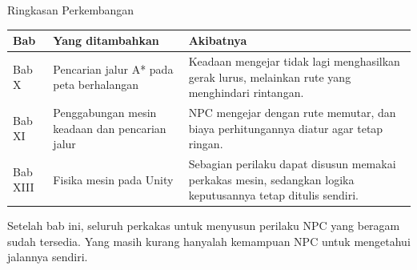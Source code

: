 \documentclass[aspectratio=169,10pt]{beamer}
\begin{document}
\begin{frame}{Ringkasan Perkembangan}
{\scriptsize
\renewcommand{\arraystretch}{1.12}
\begin{tabularx}{\textwidth}{@{}>{\raggedright\arraybackslash}p{1.7cm}
    >{\raggedright\arraybackslash}p{4.9cm}
    >{\raggedright\arraybackslash}X@{}}
\toprule
\textbf{Bab} & \textbf{Yang ditambahkan} & \textbf{Akibatnya} \\
\midrule
Bab X & Pencarian jalur A* pada peta berhalangan &
Keadaan mengejar tidak lagi menghasilkan gerak lurus, melainkan rute yang
menghindari rintangan. \\
\addlinespace
Bab XI & Penggabungan mesin keadaan dan pencarian jalur &
NPC mengejar dengan rute memutar, dan biaya perhitungannya diatur agar tetap
ringan. \\
\addlinespace
Bab XIII & Fisika mesin pada Unity &
Sebagian perilaku dapat disusun memakai perkakas mesin, sedangkan logika
keputusannya tetap ditulis sendiri. \\
\bottomrule
\end{tabularx}}
\vspace{0.10cm}
\begin{kotak}
Setelah bab ini, seluruh perkakas untuk menyusun perilaku NPC yang beragam sudah
tersedia. Yang masih kurang hanyalah kemampuan NPC untuk mengetahui jalannya
sendiri.
\end{kotak}
\end{frame}
\end{document}
